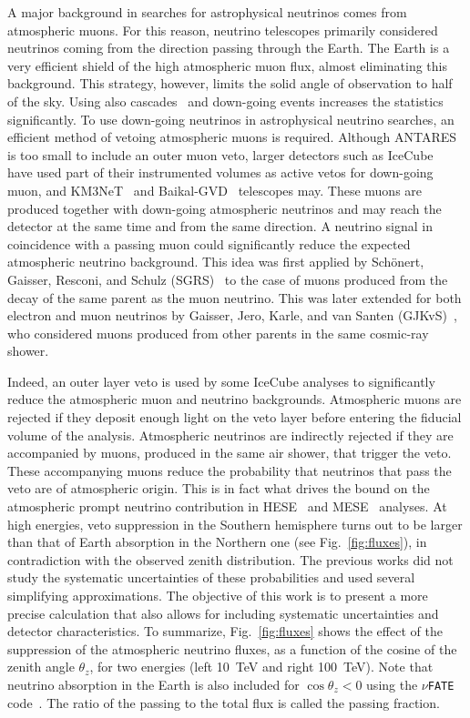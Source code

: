 \documentclass[aps,prd,showpacs,letterpaper,onecolumn,longbibliography,superscriptaddress,notitlepage,nofootinbib]{revtex4-1}%
\begin{document}
A major background in searches for astrophysical neutrinos comes from atmospheric muons. For this reason, neutrino telescopes primarily considered neutrinos coming from the direction passing through the Earth. The Earth is a very efficient shield of the high atmospheric muon flux, almost eliminating this background. This strategy, however, limits the solid angle of observation to half of the sky. Using also cascades~\cite{Beacom:2004jb} and down-going events increases the statistics significantly. To use down-going neutrinos in astrophysical neutrino searches, an efficient method of vetoing atmospheric muons is required. Although ANTARES is too small to include an outer muon veto, larger detectors such as IceCube~\cite{Achterberg:2006md} have used part of their instrumented volumes as active vetos for down-going muon, and KM3NeT~\cite{Adrian-Martinez:2016fdl} and Baikal-GVD~\cite{Baikal2017} telescopes may. These muons are produced together with down-going atmospheric neutrinos and may reach the detector at the same time and from the same direction. A neutrino signal in coincidence with a passing muon could significantly reduce the expected atmospheric neutrino background. This idea was first applied by Sch\"onert, Gaisser, Resconi, and Schulz (SGRS)~\cite{Schonert:2008is} to the case of muons produced from the decay of the same parent as the muon neutrino. This was later extended for both electron and muon neutrinos by Gaisser, Jero, Karle, and van Santen (GJKvS)~\cite{Gaisser:2014bja}, who considered muons produced from other parents in the same cosmic-ray shower.

Indeed, an outer layer veto is used by some IceCube analyses to significantly reduce the atmospheric muon and neutrino backgrounds. Atmospheric muons are rejected if they deposit enough light on the veto layer before entering the fiducial volume of the analysis. Atmospheric neutrinos are indirectly rejected if they are accompanied by muons, produced in the same air shower, that trigger the veto. These accompanying muons reduce the probability that neutrinos that pass the veto are of atmospheric origin. This is in fact what drives the bound on the atmospheric prompt neutrino contribution in HESE~\cite{Aartsen:2014gkd} and MESE~\cite{Aartsen:2014muf} analyses. At high energies, veto suppression in the Southern hemisphere turns out to be larger than that of Earth absorption in the Northern one (see Fig.~\ref{fig:fluxes}), in contradiction with the observed zenith distribution. The previous works did not study the systematic uncertainties of these probabilities and used several simplifying approximations. The objective of this work is to present a more precise calculation that also allows for including systematic uncertainties and detector characteristics. To summarize, Fig.~\ref{fig:fluxes} shows the effect of the suppression of the atmospheric neutrino fluxes, as a function of the cosine of the zenith angle $\theta_z$, for two energies (left 10~TeV and right 100~TeV). Note that neutrino absorption in the Earth is also included for $\cos \theta_z <0$ using the \texttt{$\nu$FATE} code~\cite{Vincent:2017svp}. The ratio of the passing to the total flux is called the passing fraction.
\end{document}
